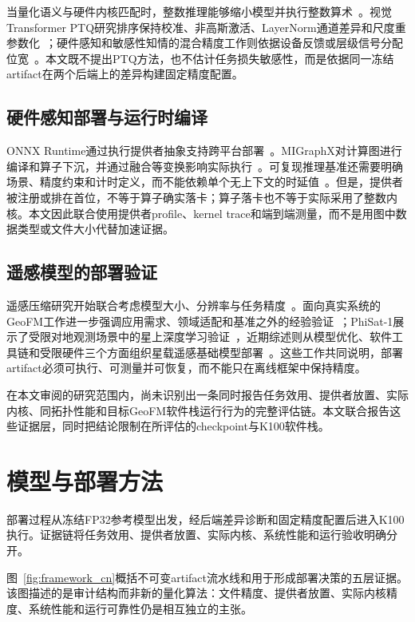 \documentclass[conference]{IEEEtran}
\begin{document}
当量化语义与硬件内核匹配时，整数推理能够缩小模型并执行整数算术~\cite{jacob2018}。视觉Transformer PTQ研究排序保持校准、非高斯激活、LayerNorm通道差异和尺度重参数化~\cite{vitptq2021,ptq4vit2022,fqvit2022,repqvit2023}；硬件感知和敏感性知情的混合精度工作则依据设备反馈或层级信号分配位宽~\cite{haq2019,hawqv3,mixqvit2026}。本文既不提出PTQ方法，也不估计任务损失敏感性，而是依据同一冻结artifact在两个后端上的差异构建固定精度配置。

\subsection{硬件感知部署与运行时编译}

ONNX Runtime通过执行提供者抽象支持跨平台部署~\cite{onnxruntime}。MIGraphX对计算图进行编译和算子下沉，并通过融合等变换影响实际执行~\cite{migraphx}。可复现推理基准还需要明确场景、精度约束和计时定义，而不能依赖单个无上下文的时延值~\cite{mlperf2020}。但是，提供者被注册或排在首位，不等于算子确实落卡；算子落卡也不等于实际采用了整数内核。本文因此联合使用提供者profile、kernel trace和端到端测量，而不是用图中数据类型或文件大小代替加速证据。

\subsection{遥感模型的部署验证}

遥感压缩研究开始联合考虑模型大小、分辨率与任务精度~\cite{shinde2025}。面向真实系统的GeoFM工作进一步强调应用需求、领域适配和基准之外的经验验证~\cite{worldcereal2025}；PhiSat-1展示了受限对地观测场景中的星上深度学习验证~\cite{phisat2022}，近期综述则从模型优化、软件工具链和受限硬件三个方面组织星载遥感基础模型部署~\cite{sang2026}。这些工作共同说明，部署artifact必须可执行、可测量并可恢复，而不能只在离线框架中保持精度。

在本文审阅的研究范围内，尚未识别出一条同时报告任务效用、提供者放置、实际内核、同拓扑性能和目标GeoFM软件栈运行行为的完整评估链。本文联合报告这些证据层，同时把结论限制在所评估的checkpoint与K100软件栈。

\section{模型与部署方法}
\label{sec:method}

部署过程从冻结FP32参考模型出发，经后端差异诊断和固定精度配置后进入K100执行。证据链将任务效用、提供者放置、实际内核、系统性能和运行验收明确分开。

图~\ref{fig:framework_cn}概括不可变artifact流水线和用于形成部署决策的五层证据。该图描述的是审计结构而非新的量化算法：文件精度、提供者放置、实际内核精度、系统性能和运行可靠性仍是相互独立的主张。
\end{document}
